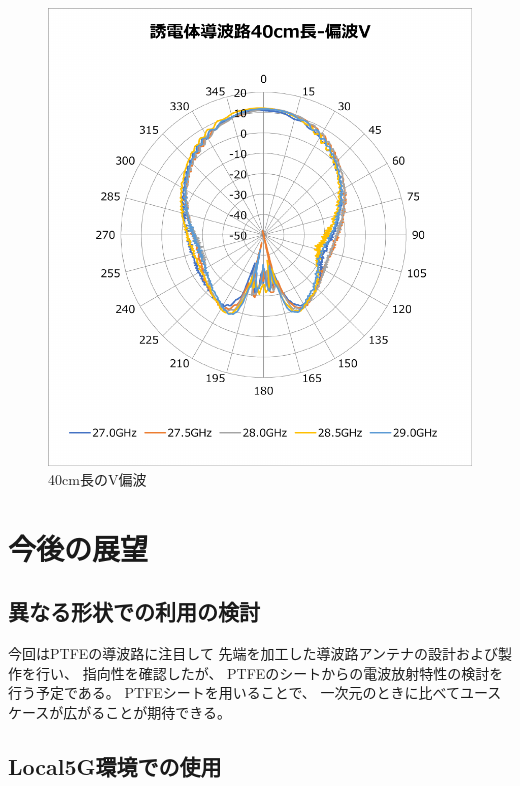 \documentclass[technicalreport]{ieicej}
\begin{document}
\begin{figure}[tb]
  \begin{center}
    \includegraphics[bb=0 0 408 430, width=0.9\linewidth]{img/waveguide-40cm-v.pdf}
    \caption{40cm長のV偏波}
    \label{fig:40cm-v}
  \end{center}
\end{figure}



\section{今後の展望}

\subsection{異なる形状での利用の検討}

今回はPTFEの導波路に注目して
先端を加工した導波路アンテナの設計および製作を行い、
指向性を確認したが、
PTFEのシートからの電波放射特性の検討を行う予定である。
PTFEシートを用いることで、
一次元のときに比べてユースケースが広がることが期待できる。

\subsection{Local5G環境での使用}
\end{document}
